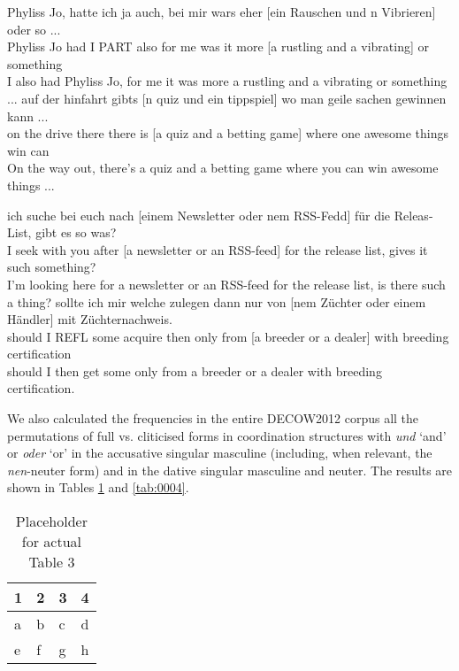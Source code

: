 \begin{exe}
\ex\label{ex:009}
	\begin{xlist}
	\ex\label{ex:0023}\gll Phyliss Jo, hatte ich ja auch, bei mir wars eher [ein Rauschen und n Vibrieren] oder so ...\\
	Phyliss Jo had I PART also for me {was it} more [a rustling and a vibrating] or something\\
	\trans I also had Phyliss Jo, for me it was more a rustling and a vibrating or something ...
	\ex\label{ex:0024}\gll auf der hinfahrt gibts [n quiz und ein tippspiel] wo man geile sachen gewinnen kann ...\\
	on the {drive there} {there is} [a quiz and a {betting game}] where one awesome things win can\\
	\trans On the way out, there's a quiz and a betting game where you can win awesome things ...
	\end{xlist}
\ex\label{ex:010}
	\begin{xlist}
	\ex\label{ex:0025}\gll ich suche bei euch nach [einem Newsletter oder nem RSS-Fedd] für die Releas-List, gibt es so was?\\
	I seek with you after [a newsletter or an RSS-feed] for the {release list}, gives it such something?\\
	\trans I'm looking here for a newsletter or an RSS-feed for the release list, is there such a thing?
	\ex\label{ex:0026}\gll sollte ich mir welche zulegen dann nur von [nem Züchter oder einem Händler] mit Züchternachweis.\\
	should I REFL some acquire then only from [a breeder or a dealer] with {breeding certification}\\
	\trans should I then get some only from a breeder or a dealer with breeding certification.
	\end{xlist}
\end{exe}

We also calculated the frequencies in the entire DECOW2012 corpus all the permutations of full vs. cliticised forms in coordination structures with \textit{und} `and' or \textit{oder} `or' in the accusative singular masculine (including, when relevant, the \textit{nen}-neuter form) and in the dative singular masculine and neuter.
The results are shown in Tables \ref{tab:0003} and \ref{tab:0004}.

\begin{table}
	\centering
	\begin{tabular}{llll}
		\toprule
		\textbf{1} & \textbf{2} & \textbf{3} & \textbf{4} \\
		\midrule
		a & b & c & d \\
		e & f & g & h \\
		\bottomrule
	\end{tabular}
	\caption{Placeholder for actual Table 3}
	\label{tab:0003}
\end{table}


